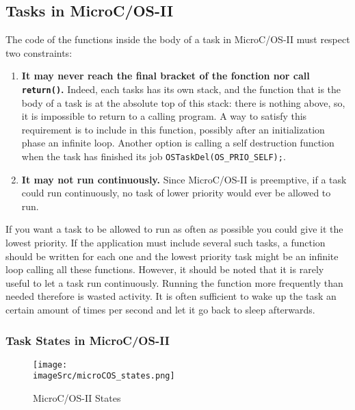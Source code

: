 \documentclass[../main.tex]{subfiles}
\begin{document}
\subsection{Tasks in MicroC/OS-II}
The code of the functions inside the body of a task in MicroC/OS-II must respect two constraints:
\begin{enumerate}
	\item \textbf{It may never reach the final bracket of the fonction nor call \texttt{return()}.} Indeed, each tasks has its own stack, and the function that is the body of a task is at the absolute top of this stack: there is nothing above, so, it is impossible to return to a calling program. A way to satisfy this requirement is to include in this function, possibly after an initialization phase an infinite loop. Another option is calling a self destruction function when the task has finished its job \texttt{OSTaskDel(OS\_PRIO\_SELF);}.
	\item \textbf{It may not run continuously.} Since  MicroC/OS-II is preemptive, if a task could run continuously, no task of lower priority would ever be allowed to run.
\end{enumerate}
If you want a task to be allowed to run as often as possible you could give it the lowest priority. If the application must include several such tasks, a function should be written for each one and the lowest priority task might be an infinite loop calling all these functions. However, it should be noted that it is rarely useful to let a task run continuously. Running the function more frequently than needed therefore is wasted activity. It is often sufficient to wake up the task an certain amount of times per second and let it go back to sleep afterwards.

\subsubsection{Task States in MicroC/OS-II}
\begin{figure}[h!]
    \centering
    \texttt{[image: \\imageSrc/microCOS\_states.png]}
    \caption{MicroC/OS-II States}
    \label{mcosii}
\end{figure}
\end{document}
